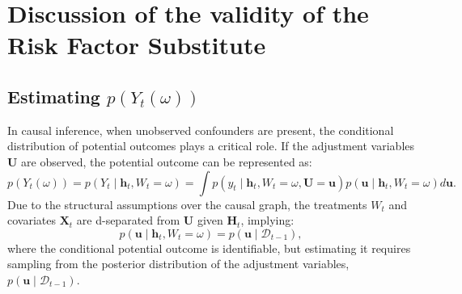 \documentclass[10pt]{article} %
\begin{document}



\section{Discussion of the validity of the Risk Factor Substitute}
\label{appendix:validity_Z_discussion}
\subsection{Estimating \texorpdfstring{$p(Y_{t}(\omega))$}{p(Yt(omega))}}
\label{appendix:consistency_discussion}
In causal inference, when unobserved confounders are present, the conditional distribution of potential outcomes plays a critical role. If the adjustment variables $\mathbf{U}$ are observed, the potential outcome can be represented as:
\[
p(Y_{t}(\omega)) = p(Y_t \mid \mathbf{h}_t, W_t = \omega) = \int p(y_t \mid \mathbf{h}_t, W_t = \omega, \mathbf{U} = \mathbf{u}) p(\mathbf{u} \mid \mathbf{h}_t, W_t = \omega) d\mathbf{u}.
\]
Due to the structural assumptions over the causal graph, the treatments $W_t$ and covariates $\mathbf{X}_t$ are d-separated from $\mathbf{U}$ given $\mathbf{H}_t$, implying:
\[
p(\mathbf{u} \mid \mathbf{h}_t, W_t = \omega) = p(\mathbf{u} \mid \mathcal{D}_{t-1}),
\]
where the conditional potential outcome is identifiable, but estimating it requires sampling from the posterior distribution of the adjustment variables, $p(\mathbf{u} \mid \mathcal{D}_{t-1})$.
\end{document}
